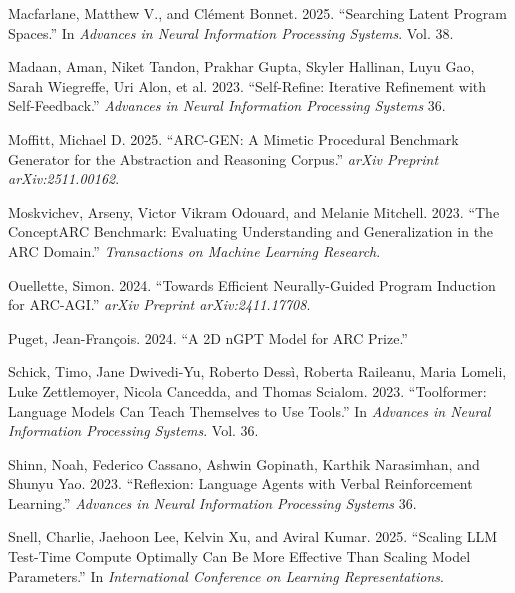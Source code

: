 \documentclass[11pt]{article}
\newlength{\cslhangindent}
\newenvironment{CSLReferences}[2] %
  {\setlength{\parindent}{0pt}%
   \setlength{\parskip}{#2\baselineskip}%
   \ifodd #1\relax
     \setlength{\leftskip}{\cslhangindent}%
     \setlength{\parindent}{-\cslhangindent}%
   \fi}
  {}
\begin{document}
\begin{CSLReferences}{1}{0}
\leavevmode{}%
Macfarlane, Matthew V., and Clément Bonnet. 2025. {``Searching Latent
Program Spaces.''} In \emph{Advances in Neural Information Processing
Systems}. Vol. 38.

\leavevmode{}%
Madaan, Aman, Niket Tandon, Prakhar Gupta, Skyler Hallinan, Luyu Gao,
Sarah Wiegreffe, Uri Alon, et al. 2023. {``Self-Refine: Iterative
Refinement with Self-Feedback.''} \emph{Advances in Neural Information
Processing Systems} 36.

\leavevmode{}%
Moffitt, Michael D. 2025. {``{ARC-GEN}: A Mimetic Procedural Benchmark
Generator for the Abstraction and Reasoning Corpus.''} \emph{arXiv
Preprint arXiv:2511.00162}.

\leavevmode{}%
Moskvichev, Arseny, Victor Vikram Odouard, and Melanie Mitchell. 2023.
{``The {ConceptARC} Benchmark: Evaluating Understanding and
Generalization in the {ARC} Domain.''} \emph{Transactions on Machine
Learning Research}.

\leavevmode{}%
Ouellette, Simon. 2024. {``Towards Efficient Neurally-Guided Program
Induction for {ARC-AGI}.''} \emph{arXiv Preprint arXiv:2411.17708}.

\leavevmode{}%
Puget, Jean-François. 2024. {``A {2D} {nGPT} Model for {ARC} Prize.''}

\leavevmode{}%
Schick, Timo, Jane Dwivedi-Yu, Roberto Dessì, Roberta Raileanu, Maria
Lomeli, Luke Zettlemoyer, Nicola Cancedda, and Thomas Scialom. 2023.
{``Toolformer: Language Models Can Teach Themselves to Use Tools.''} In
\emph{Advances in Neural Information Processing Systems}. Vol. 36.

\leavevmode{}%
Shinn, Noah, Federico Cassano, Ashwin Gopinath, Karthik Narasimhan, and
Shunyu Yao. 2023. {``Reflexion: Language Agents with Verbal
Reinforcement Learning.''} \emph{Advances in Neural Information
Processing Systems} 36.

\leavevmode{}%
Snell, Charlie, Jaehoon Lee, Kelvin Xu, and Aviral Kumar. 2025.
{``Scaling {LLM} Test-Time Compute Optimally Can Be More Effective Than
Scaling Model Parameters.''} In \emph{International Conference on
Learning Representations}.


\end{CSLReferences}
\end{document}

